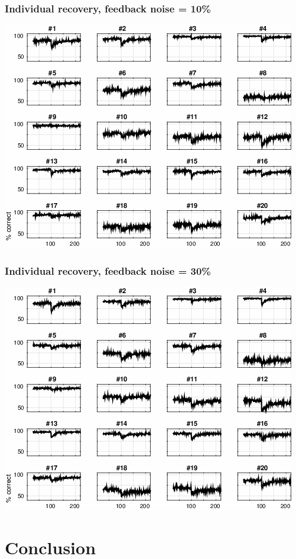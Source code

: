 \documentclass{beamer}
\begin{document}
\begin{frame}\frametitle{Individual recovery, feedback noise = 10\%}
	\centerline{
		\includegraphics[width=0.7\linewidth]{ijcnn-subj-break-n01}
	}
\end{frame}

\begin{frame}\frametitle{Individual recovery, feedback noise = 30\%}
	\centerline{
		\includegraphics[width=0.7\linewidth]{ijcnn-subj-break-n03}
	}
\end{frame}

\section{Conclusion}
\subsection*{}
\end{document}
